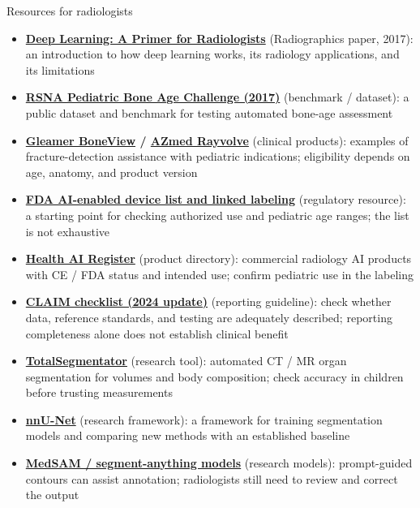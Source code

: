 \documentclass[aspectratio=169]{beamer}
\begin{document}
\begin{frame}{Resources for radiologists}
\scriptsize\fontsize{7.6}{9}\selectfont
\begin{itemize}
\setlength{\itemsep}{0pt}
\item \textbf{\href{https://doi.org/10.1148/rg.2017170077}{Deep Learning: A Primer for Radiologists}} (Radiographics paper, 2017): an introduction to how deep learning works, its radiology applications, and its limitations
\item \textbf{\href{https://www.rsna.org/rsnai/ai-image-challenge/rsna-pediatric-bone-age-challenge-2017}{RSNA Pediatric Bone Age Challenge (2017)}} (benchmark / dataset): a public dataset and benchmark for testing automated bone-age assessment
\item \textbf{\href{https://www.gleamer.ai/solutions/boneview}{Gleamer BoneView} / \href{https://www.azmed.co/}{AZmed Rayvolve}} (clinical products): examples of fracture-detection assistance with pediatric indications; eligibility depends on age, anatomy, and product version
\item \textbf{\href{https://www.fda.gov/medical-devices/software-medical-device-samd/artificial-intelligence-enabled-medical-devices}{FDA AI-enabled device list and linked labeling}} (regulatory resource): a starting point for checking authorized use and pediatric age ranges; the list is not exhaustive
\item \textbf{\href{https://healthairegister.com/radiology/products/}{Health AI Register}} (product directory): commercial radiology AI products with CE / FDA status and intended use; confirm pediatric use in the labeling
\item \textbf{\href{https://doi.org/10.1148/ryai.240300}{CLAIM checklist (2024 update)}} (reporting guideline): check whether data, reference standards, and testing are adequately described; reporting completeness alone does not establish clinical benefit
\item \textbf{\href{https://github.com/wasserth/TotalSegmentator}{TotalSegmentator}} (research tool): automated CT / MR organ segmentation for volumes and body composition; check accuracy in children before trusting measurements
\item \textbf{\href{https://github.com/MIC-DKFZ/nnUNet}{nnU-Net}} (research framework): a framework for training segmentation models and comparing new methods with an established baseline
\item \textbf{\href{https://github.com/bowang-lab/MedSAM}{MedSAM / segment-anything models}} (research models): prompt-guided contours can assist annotation; radiologists still need to review and correct the output

\end{itemize}
\end{frame}
\end{document}
